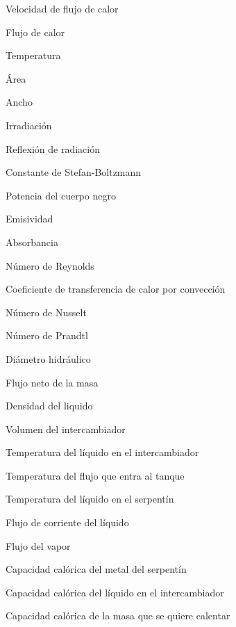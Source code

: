 \documentclass[12pt,letterpaper]{article}     %
\begin{document}
\begin{description}[labelindent=1cm,labelwidth=2.25cm,align=left]
\item [${ q }$]  Velocidad de flujo de calor
\item [$Q$] Flujo de calor
\item [$T$] Temperatura
\item [$A$] Área
\item [$L$] Ancho
\item [$G$]  Irradiación
\item [$J$] Reflexión de radiación
\item [${  \sigma }$]  Constante de Stefan-Boltzmann
\item [${ E }_{ b }$] Potencia del cuerpo negro
\item [$\epsilon$] Emisividad
\item [$\alpha$] Absorbancia
\item [${ Re }$] Número de Reynolds
\item [${ h }_{ c }$] Coeficiente de transferencia de calor por convección
\item [${Nu }$]  Número de Nusselt
\item [$Pr$] Número de Prandtl
\item [${ D}_{h }$] Diámetro hidráulico
\item [${ m }$] Flujo neto de la masa
\item [${ \rho}$] Densidad del liquido
\item [${ V }$] Volumen del intercambiador
\item [${ T(t) }$] Temperatura del líquido en el intercambiador
\item [${ T_i (t) }$] Temperatura del flujo que entra al tanque
\item [${ T_s(t) }$] Temperatura del líquido en el serpentín
\item [${ \lambda }$] Flujo de corriente del líquido
\item [${ w(t) }$] Flujo del vapor
\item [${ C_M }$] Capacidad calórica del metal del serpentín
\item [${ C_V }$] Capacidad calórica del líquido en el intercambiador
\item [${ C_p }$] Capacidad calórica de la masa que se quiere calentar






\end{description}

%
\newpage
%
\setcounter{page}{1}
\end{document}
